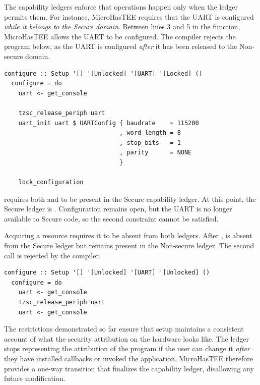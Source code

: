 \documentclass[sigconf]{acmart}
\begin{document}
The capability ledgers enforce that operations happen only when the ledger permits them.
For instance, MicroHasTEE requires that the UART is configured \textit{while it belongs to the Secure domain}.
Between lines 3 and 5 in the  function, MicroHasTEE allows the UART to be configured.
The compiler rejects the program below, as the UART is configured \textit{after} it has been released to the Non-secure domain.

\begin{lstlisting}[style=haskell]
  configure :: Setup '[] '[Unlocked] '[UART] '[Locked] ()
  configure = do
    uart <- get_console

    tzsc_release_periph uart
    uart_init uart $ UARTConfig { baudrate    = 115200
                                , word_length = 8
                                , stop_bits   = 1
                                , parity      = NONE
                                }

    lock_configuration
\end{lstlisting}

 requires both  and  to be present in the Secure capability ledger.
At this point, the Secure ledger is .
Configuration remains open, but the UART is no longer available to Secure code, so the second constraint cannot be satisfied.

Acquiring a resource requires it to be absent from both ledgers.
After ,  is absent from the Secure ledger but remains present in the Non-secure ledger.
The second  call is rejected by the compiler.

\begin{lstlisting}[style=haskell]
  configure :: Setup '[] '[Unlocked] '[UART] '[Unlocked] ()
  configure = do
    uart <- get_console
    tzsc_release_periph uart
    uart <- get_console
\end{lstlisting}

The restrictions demonstrated so far ensure that setup maintains a consistent account of what the security attribution on the hardware looks like.
The ledger stops representing the attribution of the program if the user can change it \textit{after} they have installed callbacks or invoked the application.
MicroHasTEE therefore provides a one-way transition that finalizes the capability ledger, disallowing any future modification.
\end{document}
